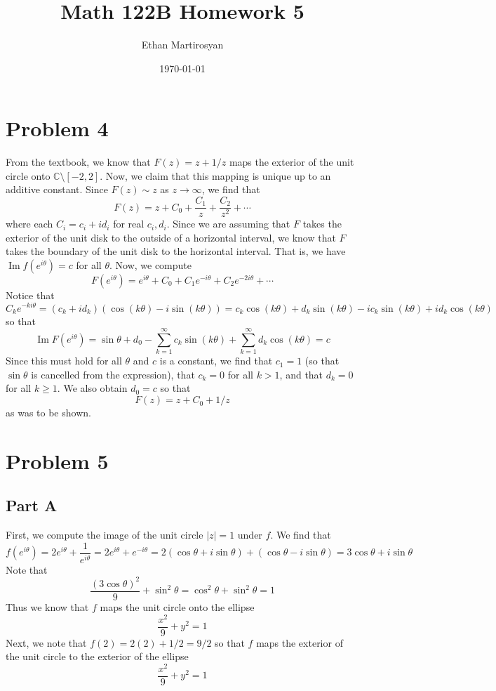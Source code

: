 \documentclass[12pt]{article}
\newcommand{\cc}{{\mathbb C}}
\DeclareMathOperator{\imag}{Im}
\begin{document}
 
\title{Math 122B Homework 5}
\author{Ethan Martirosyan}
\date{\today}
\maketitle
{}
\hfuzz=50pt
\section*{Problem 4}
From the textbook, we know that $F(z) = z + 1/z$ maps the exterior of the unit circle onto $\cc \setminus [-2,2]$. Now, we claim that this mapping is unique up to an additive constant. Since $F(z) \sim z$ as $z \rightarrow \infty$, we find that
\[
F(z) = z + C_0 + \frac{C_1}{z} + \frac{C_2}{z^2} + \cdots
\] where each $C_i = c_i + id_i$ for real $c_i, d_i$. Since we are assuming that $F$ takes the exterior of the unit disk to the outside of a horizontal interval, we know that $F$ takes the boundary of the unit disk to the horizontal interval. That is, we have $\imag f(e^{i\theta}) = c$ for all $\theta$. Now, we compute
\[
F(e^{i\theta}) =  e^{i\theta} + C_0 + C_1 e^{-i\theta} + C_2 e^{-2i\theta} + \cdots
\] Notice that
\[
C_k e^{-ki\theta} = (c_k+id_k)(\cos(k\theta)-i\sin(k\theta)) = c_k \cos(k\theta) + d_k \sin(k\theta) - ic_k\sin(k\theta) + i d_k \cos(k\theta)
\] so that
\[
\imag F(e^{i\theta}) = \sin \theta + d_0 - \sum_{k=1}^\infty c_k \sin(k\theta) + \sum_{k=1}^\infty d_k \cos(k\theta) = c
\] Since this must hold for all $\theta$ and $c$ is a constant, we find that $c_1 = 1$ (so that $\sin \theta$ is cancelled from the expression), that $c_k = 0$ for all $k > 1$, and that $d_k = 0$ for all $k \geq 1$. We also obtain $d_0 = c$ so that
\[
F(z) = z + C_0 + 1/z
\] as was to be shown.
\newpage
\section*{Problem 5}
\subsection*{Part A}
First, we compute the image of the unit circle $\vert z \vert = 1$ under $f$. We find that
\[
f(e^{i\theta}) = 2e^{i\theta} + \frac{1}{e^{i\theta}} = 2 e^{i\theta} + e^{-i\theta} = 2 (\cos \theta + i \sin \theta) + (\cos \theta - i \sin \theta) = 3\cos \theta + i \sin \theta 
\] Note that
\[
\frac{(3\cos \theta)^2}{9} + \sin^2 \theta = \cos^2 \theta + \sin^2 \theta = 1
\] Thus we know that $f$ maps the unit circle onto the ellipse 
\[
\frac{x^2}{9} + y^2 = 1
\] Next, we note that $f(2) = 2(2) + 1/2 = 9/2$ so that $f$ maps the exterior of the unit circle to the exterior of the ellipse
\[
\frac{x^2}{9} + y^2 = 1
\]
\end{document}
